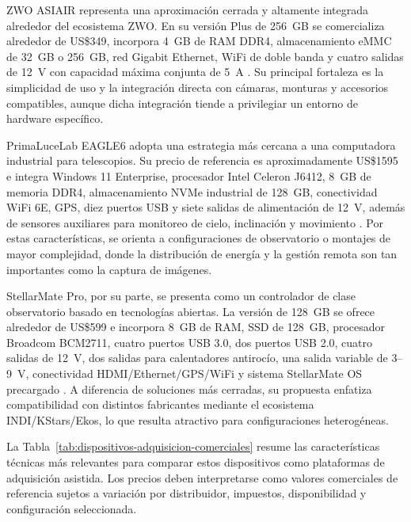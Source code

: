 ZWO ASIAIR representa una aproximación cerrada y altamente integrada alrededor del ecosistema ZWO. En su versión Plus de 256~GB se comercializa alrededor de US\$349, incorpora 4~GB de RAM DDR4, almacenamiento eMMC de 32~GB o 256~GB, red Gigabit Ethernet, WiFi de doble banda y cuatro salidas de 12~V con capacidad máxima conjunta de 5~A \citep{zwoASIAIR2026,bhASIairPlus2026}. Su principal fortaleza es la simplicidad de uso y la integración directa con cámaras, monturas y accesorios compatibles, aunque dicha integración tiende a privilegiar un entorno de hardware específico.

PrimaLuceLab EAGLE6 adopta una estrategia más cercana a una computadora industrial para telescopios. Su precio de referencia es aproximadamente US\$1595 e integra Windows 11 Enterprise, procesador Intel Celeron J6412, 8~GB de memoria DDR4, almacenamiento NVMe industrial de 128~GB, conectividad WiFi 6E, GPS, diez puertos USB y siete salidas de alimentación de 12~V, además de sensores auxiliares para monitoreo de cielo, inclinación y movimiento \citep{primaluceEagle62026,primaluceEagle6USA2026}. Por estas características, se orienta a configuraciones de observatorio o montajes de mayor complejidad, donde la distribución de energía y la gestión remota son tan importantes como la captura de imágenes.

StellarMate Pro, por su parte, se presenta como un controlador de clase observatorio basado en tecnologías abiertas. La versión de 128~GB se ofrece alrededor de US\$599 e incorpora 8~GB de RAM, SSD de 128~GB, procesador Broadcom BCM2711, cuatro puertos USB 3.0, dos puertos USB 2.0, cuatro salidas de 12~V, dos salidas para calentadores antirocío, una salida variable de 3--9~V, conectividad HDMI/Ethernet/GPS/WiFi y sistema StellarMate OS precargado \citep{stellarmatePro2026}. A diferencia de soluciones más cerradas, su propuesta enfatiza compatibilidad con distintos fabricantes mediante el ecosistema INDI/KStars/Ekos, lo que resulta atractivo para configuraciones heterogéneas.

La Tabla~\ref{tab:dispositivos-adquisicion-comerciales} resume las características técnicas más relevantes para comparar estos dispositivos como plataformas de adquisición asistida. Los precios deben interpretarse como valores comerciales de referencia sujetos a variación por distribuidor, impuestos, disponibilidad y configuración seleccionada.

